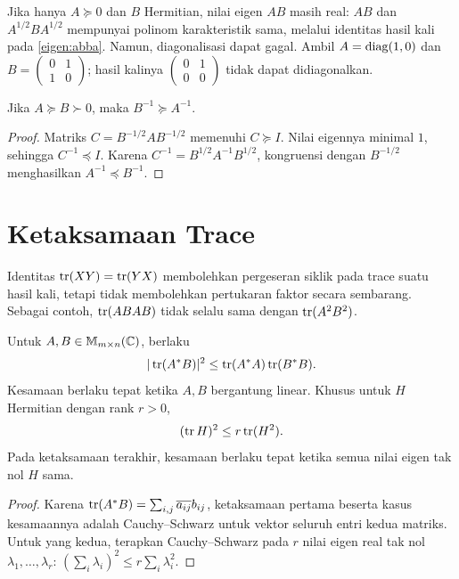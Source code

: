 Jika hanya $A\succeq0$ dan $B$ Hermitian, nilai eigen $AB$ masih real:
$AB$ dan $A^{1/2}BA^{1/2}$ mempunyai polinom karakteristik sama,
melalui identitas hasil kali pada \autoref{eigen:abba}.
Namun, diagonalisasi dapat gagal. Ambil
$A=\operatorname{diag}(1,0)$ dan $B=\begin{pmatrix}0&1\\1&0\end{pmatrix}$;
hasil kalinya $\begin{pmatrix}0&1\\0&0\end{pmatrix}$ tidak dapat didiagonalkan.

\begin{teorema}
    Jika $A\succeq B\succ0$, maka $B^{-1}\succeq A^{-1}$.
\end{teorema}
\begin{proof}
    Matriks $C=B^{-1/2}AB^{-1/2}$ memenuhi $C\succeq I$.
    Nilai eigennya minimal $1$, sehingga $C^{-1}\preceq I$.
    Karena $C^{-1}=B^{1/2}A^{-1}B^{1/2}$, kongruensi dengan
    $B^{-1/2}$ menghasilkan $A^{-1}\preceq B^{-1}$.
\end{proof}

\section{Ketaksamaan Trace}
\label{khusus:trace}

Identitas $\operatorname{tr}(XY)=\operatorname{tr}(YX)$ membolehkan pergeseran siklik pada
trace suatu hasil kali, tetapi tidak membolehkan pertukaran faktor
secara sembarang. Sebagai contoh, $\operatorname{tr}(ABAB)$ tidak selalu sama
dengan $\operatorname{tr}(A^2B^2)$.

\begin{teorema}
    Untuk $A,B\in\mathbb{M}_{m\times n}(\mathbb{C})$, berlaku
    \[
        |\operatorname{tr}(A^*B)|^2\le \operatorname{tr}(A^*A)\operatorname{tr}(B^*B).
    \]
    Kesamaan berlaku tepat ketika $A,B$ bergantung linear.
    Khusus untuk $H$ Hermitian dengan rank $r>0$,
    \[
        (\operatorname{tr} H)^2\le r\operatorname{tr}(H^2).
    \]
    Pada ketaksamaan terakhir, kesamaan berlaku tepat ketika semua
    nilai eigen tak nol $H$ sama.
\end{teorema}
\begin{proof}
    Karena $\operatorname{tr}(A^*B)=\sum_{i,j}\overline{a_{ij}}b_{ij}$,
    ketaksamaan pertama beserta kasus kesamaannya adalah
    Cauchy--Schwarz untuk vektor seluruh entri kedua matriks.
    Untuk yang kedua, terapkan Cauchy--Schwarz pada $r$ nilai eigen
    real tak nol $\lambda_1,\ldots,\lambda_r$:
    $(\sum_i\lambda_i)^2\le r\sum_i\lambda_i^2$.
\end{proof}

